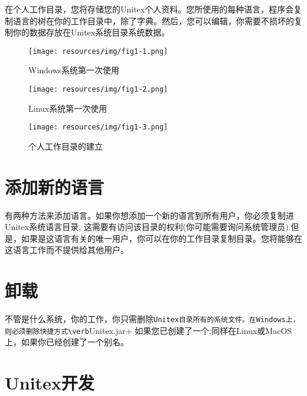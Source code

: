 \bigskip
\noindent 在个人工作目录，您将存储您的Unitex个人资料。您所使用的每种语言，程序会复制语言的树在你的工作目录中，除了字典。然后，您可以编辑，你需要不损坏的复制你的数据存放在Unitex系统目录系统数据。


\begin{figure}[h]
\begin{center}
\texttt{[image: resources/img/fig1-1.png]}
\caption{Windows系统第一次使用}
\end{center}
\end{figure}

\begin{figure}[h]
\begin{center}
\texttt{[image: resources/img/fig1-2.png]}
\caption{Linux系统第一次使用}
\end{center}
\end{figure}

\begin{figure}[h]
\begin{center}
\texttt{[image: resources/img/fig1-3.png]}
\caption{个人工作目录的建立
\label{fig-creation-personal-directory}}
\end{center}
\end{figure}



\section{添加新的语言}

\bigskip
\noindent 有两种方法来添加语言。如果你想添加一个新的语言到所有用户，你必须复制进Unitex系统语言目录,
这需要有访问该目录的权利(你可能需要询问系统管理员).但是，如果是这语言有关的唯一用户，你可以在你的工作目录复制目录。您将能够在这语言工作而不提供给其他用户。


\section{卸载}
不管是什么系统，你的工作，你只需删除\verb+Unitex目录所有的系统文件。在Windows上，则必须删除快捷方式\verb+Unitex.jar+  如果您已创建了一个;同样在Linux或MacOS上，如果你已经创建了一个别名。


\section{Unitex开发}
\label{section-unitex-developpers}

